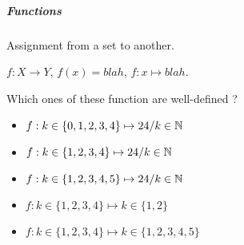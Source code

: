 \subparagraph{Functions}
\begin{definition}[Functions]
    Assignment from a set to another.
\end{definition}
\begin{notation}[Function]
    $f: X \to Y$, $f(x)=blah$, $f: x \mapsto blah$.
\end{notation}
\begin{question}
    Which ones of these function are well-defined ?
    \begin{itemize}
        \item $f:k\in \{0,1,2,3,4\}\mapsto 24/k\in \mathbb{N}$
        \item $f:k\in \{1,2,3,4\}\mapsto 24/k\in \mathbb{N}$
        \item $f:k\in \{1,2,3,4,5\}\mapsto 24/k\in \mathbb{N}$
        \item $f:k\in \{1,2,3,4\}\mapsto k\in \{1,2\}$
        \item $f:k\in \{1,2,3,4\}\mapsto k\in \{1,2,3,4,5\}$
    \end{itemize}
\end{question}

